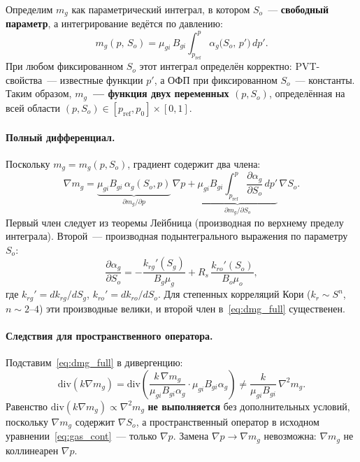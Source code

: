 \documentclass[12pt,a4paper]{article}
\begin{document}
Определим $m_g$ как параметрический интеграл,
в котором $S_o$~--- \textbf{свободный параметр},
а интегрирование ведётся по давлению:
\begin{equation}\label{eq:mg_multi}
  \boxed{m_g(p,\,S_o) = \mu_{gi}\,B_{gi}\int_{p_{\mathrm{ref}}}^{p}
  \alpha_g\bigl(S_o,\,p'\bigr)\,dp'.}
\end{equation}
При любом фиксированном $S_o$ этот интеграл определён
корректно: PVT-свойства~--- известные функции $p'$,
а ОФП при фиксированном $S_o$~--- константы.
Таким образом, \textbf{$m_g$~--- функция двух переменных
$(p, S_o)$}, определённая на всей области
$(p, S_o) \in [p_{\mathrm{ref}}, p_0] \times [0, 1]$.

\paragraph{Полный дифференциал.}
Поскольку $m_g = m_g(p, S_o)$, градиент содержит два члена:
\begin{equation}\label{eq:dmg_full}
  \boxed{\nabla m_g
  = \underbrace{\mu_{gi}B_{gi}\,\alpha_g(S_o,p)}_{
    \partial m_g/\partial p}\,\nabla p
  + \underbrace{\mu_{gi}B_{gi}\int_{p_{\mathrm{ref}}}^{p}
    \frac{\partial\alpha_g}{\partial S_o}\,dp'}_{
    \partial m_g/\partial S_o}\,\nabla S_o.}
\end{equation}
Первый член следует из теоремы Лейбница (производная
по верхнему пределу интеграла). Второй~---
производная подынтегрального выражения по параметру~$S_o$:
\begin{equation}\label{eq:dalpha_dS}
  \frac{\partial\alpha_g}{\partial S_o}
  = -\frac{k_{rg}'(S_g)}{B_g\mu_g}
  + R_s\,\frac{k_{ro}'(S_o)}{B_o\mu_o},
\end{equation}
где $k_{rg}' = dk_{rg}/dS_g$, $k_{ro}' = dk_{ro}/dS_o$.
Для степенных корреляций Кори ($k_r \sim S^n$, $n \sim 2$--$4$)
эти производные велики, и второй член
в~\eqref{eq:dmg_full} существенен.

\paragraph{Следствия для пространственного оператора.}
Подставим~\eqref{eq:dmg_full} в дивергенцию:
\begin{equation}\label{eq:div_mg_full}
  \mathrm{div}(k\nabla m_g)
  = \mathrm{div}\!\left(\frac{k\,\nabla m_g}
    {\mu_{gi}B_{gi}\alpha_g}\cdot\mu_{gi}B_{gi}\alpha_g\right)
  \neq \frac{k}{\mu_{gi}B_{gi}}\,\nabla^2 m_g.
\end{equation}
Равенство $\mathrm{div}(k\nabla m_g) \propto \nabla^2 m_g$
\textbf{не выполняется} без дополнительных условий,
поскольку $\nabla m_g$ содержит $\nabla S_o$,
а пространственный оператор в исходном
уравнении~\eqref{eq:gas_cont}~--- только $\nabla p$.
Замена $\nabla p \to \nabla m_g$ невозможна:
$\nabla m_g$ не коллинеарен $\nabla p$.
\end{document}
